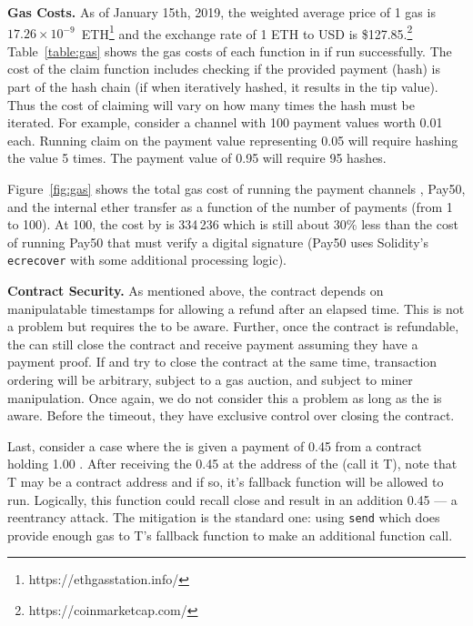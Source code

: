 \textbf{Gas Costs.} As of January 15th, 2019, the weighted average price of 1 gas is $17.26\times10^{-9}$~ETH\footnote{https://ethgasstation.info/} and the exchange rate of 1 ETH to USD is \$127.85.\footnote{https://coinmarketcap.com/} Table~\ref{table:gas} shows the gas costs of each function in \ew if run successfully. The cost of the claim function includes checking if the provided payment (hash) is part of the hash chain (if when iteratively hashed, it results in the tip value). Thus the cost of claiming will vary on how many times the hash must be iterated. For example, consider a channel with 100 payment values worth 0.01 \eth each. Running claim on the payment value representing 0.05 \eth will require hashing the value 5 times. The payment value of 0.95 \eth will require 95 hashes. 

Figure~\ref{fig:gas} shows the total gas cost of running the payment channels \ew, \textsf{Pay50}, and the internal  ether transfer as a function of the number of payments (from 1 to 100). At 100, the cost by \eww is 334\,236 which is still about 30\% less than the cost of running \textsf{Pay50} that must verify a digital signature (\ie \textsf{Pay50} uses Solidity's \texttt{ecrecover} with some additional processing logic).

\textbf{Contract Security.} As mentioned above, the contract depends on manipulatable timestamps for allowing a refund after an elapsed time. This is not a problem but requires the \take to be aware. Further, once the contract is refundable, the \take can still close the contract and receive payment assuming they have a payment proof. If \take and \make try to close the contract at the same time, transaction ordering will be arbitrary, subject to a gas auction, and subject to miner manipulation. Once again, we do not consider this a problem as long as the \take is aware. Before the timeout, they have exclusive control over closing the contract. 

Last, consider a case where the \take is given a payment of 0.45 \eth from a contract holding 1.00 \eth. After receiving the 0.45 \eth at the address of the \take (call it T), note that T may be a contract address and if so, it's fallback function will be allowed to run. Logically, this function could recall close and result in an addition 0.45 \eth --- a reentrancy attack. The mitigation is the standard one: using \texttt{send} which does provide enough gas to  T's fallback function to make an additional function call. 


